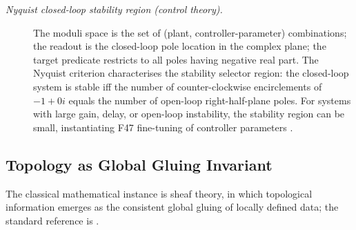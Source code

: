 \documentclass[11pt]{article}
\theoremstyle{definition}
\begin{document}
\begin{description}
\item[\emph{Nyquist closed-loop stability region
(control theory).}]
The moduli space is the set of (plant,
controller-parameter) combinations; the readout is
the closed-loop pole location in the complex plane;
the target predicate restricts to all poles having
negative real part.  The Nyquist criterion
characterises the stability selector region: the
closed-loop system is stable iff the number of
counter-clockwise encirclements of \(-1+0i\) equals
the number of open-loop right-half-plane poles.  For
systems with large gain, delay, or open-loop
instability, the stability region can be small,
instantiating F47 fine-tuning of controller
parameters \citep{Nyquist1932Regeneration}.
\end{description}

\subsection{Topology as Global Gluing Invariant}\label{sec:self-reference-limits:topology}

The classical mathematical instance is sheaf theory, in which
topological information emerges as the consistent global gluing of
locally defined data; the standard reference is
\citet{MacLaneMoerdijk1992Sheaves}.
\end{document}
